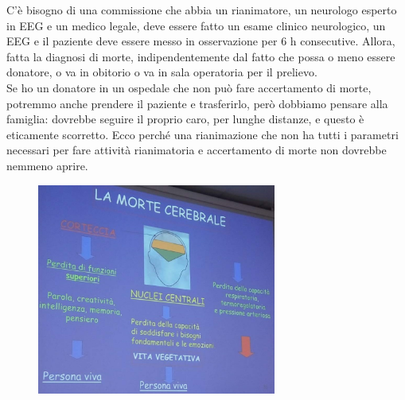 C'è bisogno di una commissione che abbia un rianimatore, un neurologo
esperto in EEG e un medico legale, deve essere fatto un esame clinico
neurologico, un EEG e il paziente deve essere messo in osservazione per
6 h consecutive. Allora, fatta la diagnosi di morte, indipendentemente
dal fatto che possa o meno essere donatore, o va in obitorio o va in
sala operatoria per il prelievo.
\\
Se ho un donatore in un ospedale che non può fare accertamento di morte,
potremmo anche prendere il paziente e trasferirlo, però dobbiamo pensare
alla famiglia: dovrebbe seguire il proprio caro, per lunghe distanze, e
questo è eticamente scorretto. Ecco perché una rianimazione che non ha
tutti i parametri necessari per fare attività rianimatoria e
accertamento di morte non dovrebbe nemmeno aprire.

\begin{figure}[!ht]
\centering
	\includegraphics[width=0.7\textwidth]{34/image12.jpeg}
	\end{figure}

